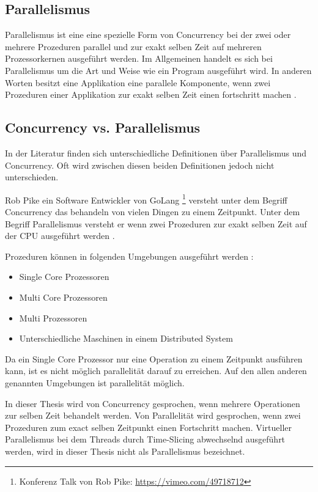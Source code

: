\subsection{Parallelismus}

Parallelismus ist eine eine spezielle Form von Concurrency bei der zwei oder mehrere Prozeduren parallel und  zur exakt selben Zeit auf mehreren Prozessorkernen ausgeführt werden. Im Allgemeinen handelt es sich bei Parallelismus um die Art und Weise wie ein Program ausgeführt wird. In anderen Worten besitzt eine Applikation eine parallele Komponente, wenn zwei Prozeduren einer Applikation zur exakt selben Zeit einen fortschritt machen \cite[]{oracle:multithreading}.

\subsection{Concurrency vs. Parallelismus}

In der Literatur finden sich unterschiedliche Definitionen über Parallelismus und Concurrency. Oft wird zwischen diesen beiden Definitionen jedoch nicht unterschieden. 

Rob Pike ein Software Entwickler von GoLang \footnote{Konferenz Talk von Rob Pike: \url{https://vimeo.com/49718712}} versteht unter dem Begriff Concurrency das behandeln von vielen Dingen zu einem Zeitpunkt. Unter dem Begriff Parallelismus versteht er wenn zwei Prozeduren zur exakt selben Zeit auf der CPU ausgeführt werden \cite[]{Pik2013}.

Prozeduren können in folgenden Umgebungen ausgeführt werden \cite[p. 14]{Erb2012}:

\begin{itemize}
  \item Single Core Prozessoren
  \item Multi Core Prozessoren
  \item Multi Prozessoren
  \item Unterschiedliche Maschinen in einem Distributed System
\end{itemize} 

Da ein Single Core Prozessor nur eine Operation zu einem Zeitpunkt ausführen kann, ist es nicht möglich parallelität darauf zu erreichen. Auf den allen anderen genannten Umgebungen ist parallelität möglich. 

In dieser Thesis wird von Concurrency gesprochen, wenn mehrere Operationen zur selben Zeit behandelt werden.  Von Parallelität wird gesprochen, wenn zwei Prozeduren zum exact selben Zeitpunkt einen Fortschritt machen. Virtueller Parallelismus bei dem Threads durch Time-Slicing abwechselnd ausgeführt werden, wird in dieser Thesis nicht als Parallelismus bezeichnet.

